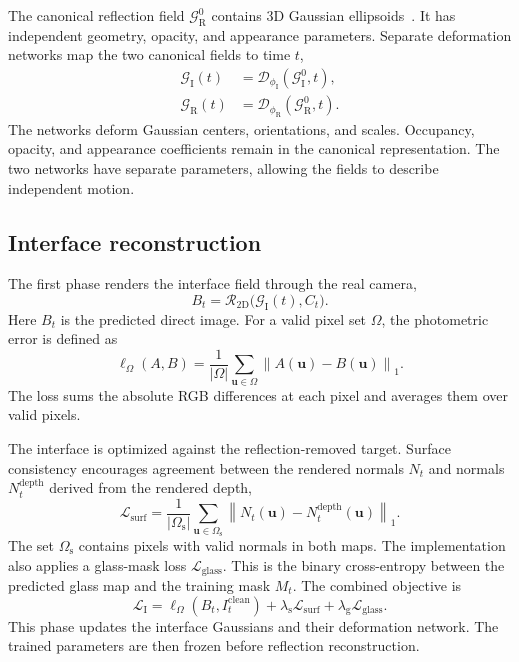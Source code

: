 The canonical reflection field $\mathcal{G}_{\mathrm{R}}^0$ contains 3D Gaussian ellipsoids~\cite{kerbl2023}. It has independent geometry, opacity, and appearance parameters. Separate deformation networks map the two canonical fields to time $t$,
\begin{equation}
  \begin{aligned}
    \mathcal{G}_{\mathrm{I}}(t)
      &= \mathcal{D}_{\phi_{\mathrm{I}}}(\mathcal{G}_{\mathrm{I}}^0,t),\\
    \mathcal{G}_{\mathrm{R}}(t)
      &= \mathcal{D}_{\phi_{\mathrm{R}}}(\mathcal{G}_{\mathrm{R}}^0,t).
  \end{aligned}
  \label{eq:time-fields}
\end{equation}
The networks deform Gaussian centers, orientations, and scales. Occupancy, opacity, and appearance coefficients remain in the canonical representation. The two networks have separate parameters, allowing the fields to describe independent motion.

\subsection{Interface reconstruction}
The first phase renders the interface field through the real camera,
\begin{equation}
  B_t = \mathcal{R}_{\mathrm{2D}}\bigl(\mathcal{G}_{\mathrm{I}}(t),C_t\bigr).
  \label{eq:direct-render}
\end{equation}
Here $B_t$ is the predicted direct image. For a valid pixel set $\Omega$, the photometric error is defined as
\begin{equation}
  \ell_{\Omega}(A,B)
    = \frac{1}{|\Omega|}\sum_{\mathbf{u}\in\Omega}
      \left\|A(\mathbf{u})-B(\mathbf{u})\right\|_1.
  \label{eq:photometric-error}
\end{equation}
The loss sums the absolute RGB differences at each pixel and averages them over valid pixels.

The interface is optimized against the reflection-removed target. Surface consistency encourages agreement between the rendered normals $N_t$ and normals $N_t^{\mathrm{depth}}$ derived from the rendered depth,
\begin{equation}
  \mathcal{L}_{\mathrm{surf}}
    = \frac{1}{|\Omega_{\mathrm{s}}|}
      \sum_{\mathbf{u}\in\Omega_{\mathrm{s}}}
      \left\|N_t(\mathbf{u})-N_t^{\mathrm{depth}}(\mathbf{u})\right\|_1.
  \label{eq:surface-consistency}
\end{equation}
The set $\Omega_{\mathrm{s}}$ contains pixels with valid normals in both maps. The implementation also applies a glass-mask loss $\mathcal{L}_{\mathrm{glass}}$. This is the binary cross-entropy between the predicted glass map and the training mask $M_t$. The combined objective is
\begin{equation}
  \mathcal{L}_{\mathrm{I}}
    = \ell_{\Omega}(B_t,I_t^{\mathrm{clean}})
      + \lambda_{\mathrm{s}}\mathcal{L}_{\mathrm{surf}}
      + \lambda_{\mathrm{g}}\mathcal{L}_{\mathrm{glass}}.
  \label{eq:interface-objective}
\end{equation}
This phase updates the interface Gaussians and their deformation network. The trained parameters are then frozen before reflection reconstruction.

